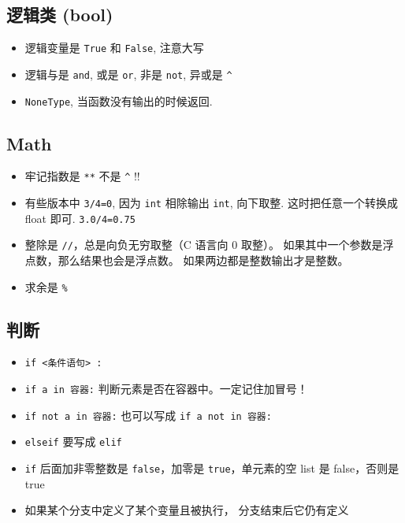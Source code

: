 \subsection{逻辑类 (bool)}
\begin{itemize}
\item 逻辑变量是 \verb`True` 和 \verb`False`, 注意大写
\item 逻辑与是 \verb`and`, 或是 \verb`or`, 非是 \verb`not`, 异或是 \verb`^`
\item \verb`NoneType`, 当函数没有输出的时候返回.
\end{itemize}

\subsection{Math}
\begin{itemize}
\item 牢记指数是 \verb`**` 不是 \verb`^` !!
\item 有些版本中 \verb`3/4=0`, 因为 \verb`int` 相除输出 \verb`int`, 向下取整. 这时把任意一个转换成 float 即可. \verb`3.0/4=0.75`
\item 整除是 \verb`//`，总是向负无穷取整（C 语言向 0 取整）。 如果其中一个参数是浮点数，那么结果也会是浮点数。 如果两边都是整数输出才是整数。
\item 求余是 \verb`%`
\end{itemize}

\subsection{判断}
\begin{itemize}
\item \verb`if <条件语句> :`
\item \verb`if a in 容器:` 判断元素是否在容器中。一定记住加冒号！
\item \verb`if not a in 容器:` 也可以写成 \verb`if a not in 容器:`
\item \verb`elseif` 要写成 \verb`elif`
\item \verb`if` 后面加非零整数是 \verb`false`，加零是 \verb`true`，单元素的空 list 是 false，否则是 true
\item 如果某个分支中定义了某个变量且被执行， 分支结束后它仍有定义
\end{itemize}

